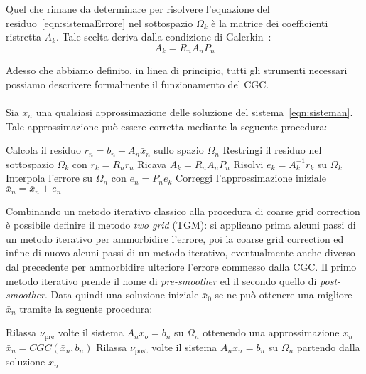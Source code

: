
Quel che rimane da determinare per risolvere l'equazione del residuo~\eqref{eqn:sistemaErrore} nel sottospazio $\Omega_k$ è la matrice dei coefficienti ristretta $A_k$. Tale scelta deriva dalla condizione di Galerkin~\cite{MGM_tutorial}:
\begin{equation}
A_k = R_n A_n P_n
\end{equation}

Adesso che abbiamo definito, in linea di principio, tutti gli strumenti necessari possiamo descrivere formalmente il funzionamento del CGC.\\
\\
Sia $\bar{x}_n$ una qualsiasi approssimazione delle soluzione del sistema~\eqref{eqn:sisteman}. Tale approssimazione può essere corretta mediante la seguente procedura:


\begin{algorithm}
\caption{$\bar{x}_n = \text{CGC}(\bar{x}_n,b_n)$}
\label{alg:CGC}
\begin{algorithmic}[1]
\State Calcola il residuo $r_n = b_n - A_n\bar{x}_n$ sullo spazio $\Omega_n$
\State Restringi il residuo nel sottospazio $\Omega_k$ con $r_k = R_nr_n$
\State Ricava $A_k = R_n A_n P_n$
\State Risolvi $e_k = A_k^{-1}r_k$ su $\Omega_k$
\State Interpola l'errore su $\Omega_n$ con $e_n = P_ne_k$
\State Correggi l'approssimazione iniziale $\bar{x}_n = \bar{x}_n + e_n$
\end{algorithmic}
\end{algorithm}


Combinando un metodo iterativo classico alla procedura di coarse grid correction è possibile definire il metodo \emph{two grid} (TGM): si applicano prima alcuni passi di un metodo iterativo per ammorbidire l'errore, poi la coarse grid correction ed infine di nuovo alcuni passi di un metodo iterativo, eventualmente anche diverso dal precedente per ammorbidire ulteriore l'errore commesso dalla CGC. Il primo metodo iterativo prende il nome di \emph{pre-smoother} ed il secondo quello di \emph{post-smoother}.
Data quindi una soluzione iniziale $\bar{x}_0$ se ne può ottenere una migliore $\bar{x}_n$ tramite la seguente procedura:
\begin{algorithm}
\caption{$\bar{x}_n = \text{TGM}(\bar{x}_0)$}
\label{alg:TGM}
\begin{algorithmic}[1]
\State Rilassa $\nu_{\text{pre}}$ volte il sistema $A_n \bar{x}_o = b_n$ su $\Omega_n$ ottenendo una approssimazione $\bar{x}_n$
\State $\bar{x}_n = CGC(\bar{x}_n,b_n)$
\State Rilassa $\nu_{\text{post}}$ volte il sistema $A_nx_n = b_n$ su $\Omega_n$ partendo dalla soluzione $\bar{x}_n$
\end{algorithmic}
\end{algorithm}

